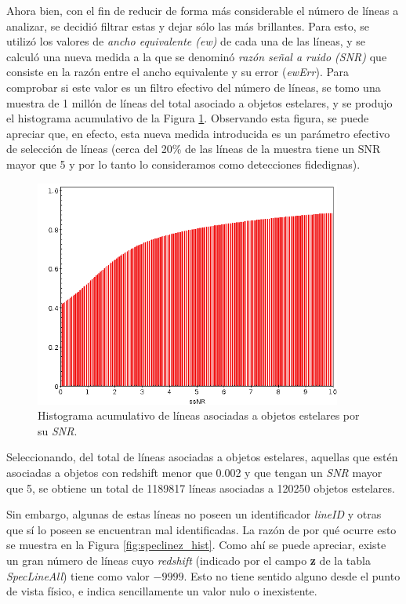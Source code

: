 Ahora bien, con el fin de reducir de forma más considerable el número de líneas a analizar, se decidió filtrar estas y dejar sólo las más brillantes. Para esto, se utilizó los valores de \textit{ancho equivalente (ew)} de cada una de las líneas, y se calculó una nueva medida a la que se denominó \textit{razón señal a ruido (SNR)} que consiste en la razón entre el ancho equivalente y su error (\textit{ewErr}). Para comprobar si este valor es un filtro efectivo del número de líneas, se tomo una muestra de 1 millón de líneas del total asociado a objetos estelares, y se produjo el histograma acumulativo de la Figura \ref{fig:stelar_obj_snr}. Observando esta figura, se puede apreciar que, en efecto, esta nueva medida introducida es un parámetro efectivo de selección de líneas (cerca del 20\% de las líneas de la muestra tiene un SNR mayor que 5 y por lo tanto lo consideramos como detecciones fidedignas).

\begin{figure}[h!]
\begin{center}
\includegraphics[width=0.9\textwidth]{imagenes/stelar_obj_snr_hist.png}
\end{center}
\vspace*{-5mm}
\caption{Histograma acumulativo de líneas asociadas a objetos estelares por su \textit{SNR}.}
\label{fig:stelar_obj_snr}
\end{figure}

Seleccionando, del total de líneas asociadas a objetos estelares, aquellas que estén asociadas a objetos con redshift menor que 0.002 y que tengan un \textit{SNR} mayor que 5, se obtiene un total de 1189817 líneas asociadas a 120250 objetos estelares. 

Sin embargo, algunas de estas líneas no poseen un identificador \textit{lineID} y otras que sí lo poseen se encuentran mal identificadas. La razón de por qué ocurre esto se muestra en la Figura \ref{fig:speclinez_hist}. Como ahí se puede apreciar, existe un gran número de líneas cuyo \textit{redshift} (indicado por el campo \textbf{z} de la tabla \textit{SpecLineAll}) tiene como valor ${-9999}$. Esto no tiene sentido alguno desde el punto de vista físico, e indica sencillamente un valor nulo o inexistente.

